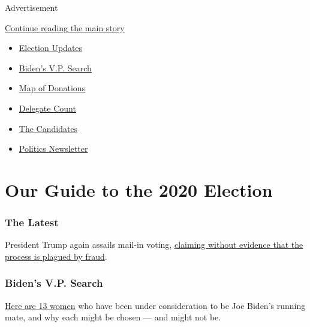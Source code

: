 Advertisement

\protect\hyperlink{after-subheader}{Continue reading the main story}

\begin{itemize}
\item
  \href{https://www.nytimes3xbfgragh.onion/2020/08/03/us/elections/biden-vs-trump.html}{Election
  Updates}
\item
  \href{https://www.nytimes3xbfgragh.onion/article/biden-vice-president-2020.html}{Biden's
  V.P. Search}
\item
  \href{https://www.nytimes3xbfgragh.onion/interactive/2020/07/24/us/politics/trump-biden-campaign-donors.html}{Map
  of Donations}
\item
  \href{https://www.nytimes3xbfgragh.onion/interactive/2020/us/elections/delegate-count-primary-results.html}{Delegate
  Count}
\item
  \href{https://www.nytimes3xbfgragh.onion/interactive/2019/us/politics/2020-presidential-candidates.html}{The
  Candidates}
\item
  \href{https://www.nytimes3xbfgragh.onion/newsletters/politics}{Politics
  Newsletter}
\end{itemize}

\hypertarget{our-guide-to-the-2020-election}{%
\section{Our Guide to the 2020
Election}\label{our-guide-to-the-2020-election}}

\hypertarget{the-latest}{%
\subsubsection{The Latest}\label{the-latest}}

President Trump again assails mail-in voting,
\href{https://www.nytimes3xbfgragh.onion/2020/08/03/us/politics/trump-mail-in-voting.html}{claiming
without evidence that the process is plagued by fraud}.

\hypertarget{bidens-vp-search}{%
\subsubsection{Biden's V.P. Search}\label{bidens-vp-search}}

\href{https://www.nytimes3xbfgragh.onion/article/biden-vice-president-2020.html}{Here
are 13 women} who have been under consideration to be Joe Biden's
running mate, and why each might be chosen --- and might not be.

